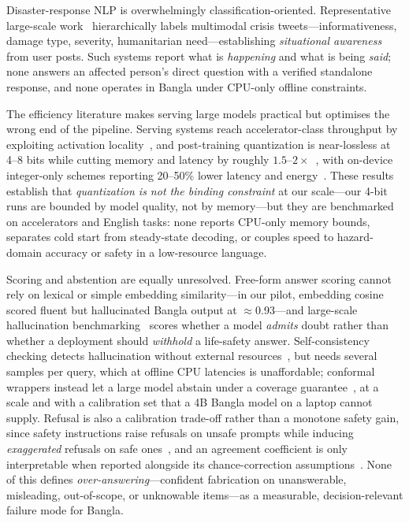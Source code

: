 \documentclass[conference]{IEEEtran}
\begin{document}
Disaster-response NLP is overwhelmingly classification-oriented. Representative large-scale
work~\cite{disastermultimodal} hierarchically labels multimodal crisis tweets---informativeness,
damage type, severity, humanitarian need---establishing \emph{situational awareness} from user posts.
Such systems report what is \emph{happening} and what is being \emph{said}; none answers an affected
person's direct question with a verified standalone response, and none operates in Bangla under
CPU-only offline constraints.

The efficiency literature makes serving large models practical but optimises the wrong end of the
pipeline. Serving systems reach accelerator-class throughput by exploiting activation
locality~\cite{powerinfer}, and post-training quantization is near-lossless at 4--8 bits while
cutting memory and latency by roughly $1.5$--$2\times$~\cite{smoothquant,awq}, with on-device
integer-only schemes reporting 20--50\% lower latency and energy~\cite{mobilequant,agilequant}. These
results establish that \emph{quantization is not the binding constraint} at our scale---our 4-bit
runs are bounded by model quality, not by memory---but they are benchmarked on accelerators and
English tasks: none reports CPU-only memory bounds, separates cold start from steady-state decoding,
or couples speed to hazard-domain accuracy or safety in a low-resource language.

Scoring and abstention are equally unresolved. Free-form answer scoring cannot rely on lexical or
simple embedding similarity---in our pilot, embedding cosine scored fluent but hallucinated Bangla
output at $\approx$0.93---and large-scale hallucination benchmarking~\cite{halueval2} scores whether a model
\emph{admits} doubt rather than whether a deployment should \emph{withhold} a life-safety answer.
Self-consistency checking detects hallucination without external resources~\cite{selfcheckgpt}, but needs
several samples per query, which at offline CPU latencies is unaffordable; conformal wrappers instead let a
large model abstain under a coverage guarantee~\cite{knowno}, at a scale and with a calibration set that a 4B
Bangla model on a laptop cannot supply. Refusal is also a calibration trade-off rather than a monotone safety
gain, since safety instructions raise refusals on unsafe prompts while inducing \emph{exaggerated} refusals
on safe ones~\cite{xstest}, and an agreement coefficient is only interpretable when reported alongside its
chance-correction assumptions~\cite{iaa}. None of this defines \emph{over-answering}---confident fabrication
on unanswerable, misleading, out-of-scope, or unknowable items---as a measurable, decision-relevant failure
mode for Bangla.
\end{document}
